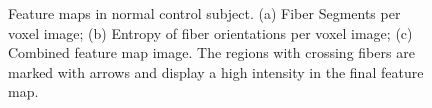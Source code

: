 \documentclass{llncs}
\begin{document}

\begin{figure}
    \centering
    \caption{Feature maps in normal control subject. (a) Fiber Segments per voxel image; (b) Entropy of fiber orientations per voxel image; (c) Combined feature map image. The regions with crossing fibers are marked with arrows and display a high intensity in the final feature map.}
    \label{fig:featureMap}
\end{figure}
\end{document}
